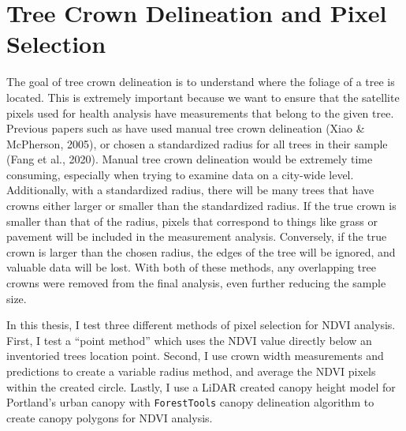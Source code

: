 \documentclass[12pt,twoside]{reedthesis}
\begin{document}
\hypertarget{tree-crown-delineation-and-pixel-selection}{%
\section{Tree Crown Delineation and Pixel Selection}\label{tree-crown-delineation-and-pixel-selection}}

The goal of tree crown delineation is to understand where the foliage of a tree is located. This is extremely important because we want to ensure that the satellite pixels used for health analysis have measurements that belong to the given tree. Previous papers such as have used manual tree crown delineation (Xiao \& McPherson, 2005), or chosen a standardized radius for all trees in their sample (Fang et al., 2020). Manual tree crown delineation would be extremely time consuming, especially when trying to examine data on a city-wide level. Additionally, with a standardized radius, there will be many trees that have crowns either larger or smaller than the standardized radius. If the true crown is smaller than that of the radius, pixels that correspond to things like grass or pavement will be included in the measurement analysis. Conversely, if the true crown is larger than the chosen radius, the edges of the tree will be ignored, and valuable data will be lost. With both of these methods, any overlapping tree crowns were removed from the final analysis, even further reducing the sample size.

In this thesis, I test three different methods of pixel selection for NDVI analysis. First, I test a ``point method'' which uses the NDVI value directly below an inventoried trees location point. Second, I use crown width measurements and predictions to create a variable radius method, and average the NDVI pixels within the created circle. Lastly, I use a LiDAR created canopy height model for Portland's urban canopy with \texttt{ForestTools} canopy delineation algorithm to create canopy polygons for NDVI analysis.
\end{document}
